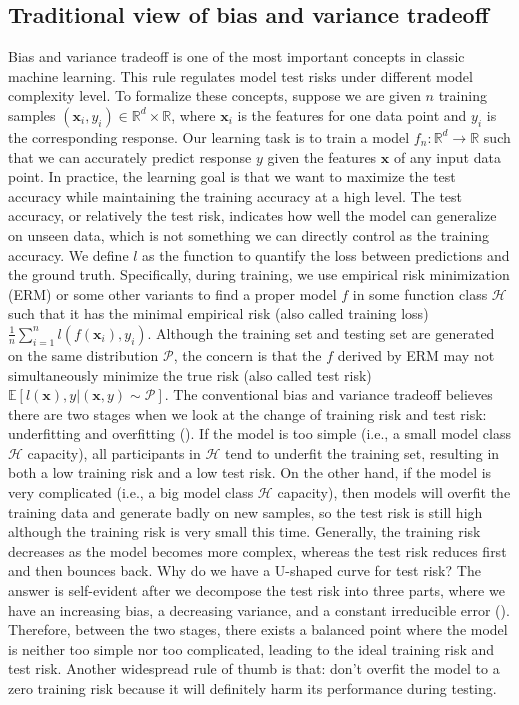 \documentclass{article}
\begin{document}
\subsection{Traditional view of bias and variance tradeoff} \label{traditional}
\vspace{-1mm}
Bias and variance tradeoff is one of the most important concepts in classic machine learning. This rule regulates model test risks under different model complexity level. To formalize these concepts, suppose we are given $n$ training samples $(\mathbf{x}_i, y_i) \in \mathbb{R}^d \times \mathbb{R}$, where $\mathbf{x}_i$ is the features for one data point and $y_i$ is the corresponding response. Our learning task is to train a model $f_n: \mathbb{R}^d \to \mathbb{R}$ such that we can accurately predict response $y$ given the features $\mathbf{x}$ of any input data point. In practice, the learning goal is that we want to maximize the test accuracy while maintaining the training accuracy at a high level. The test accuracy, or relatively the test risk, indicates how well the model can generalize on unseen data, which is not something we can directly control as the training accuracy. We define $l$ as the function to quantify the loss between predictions and the ground truth. Specifically, during training, we use empirical risk minimization (ERM) or some other variants to find a proper model $f$ in some function class $\mathcal{H}$ such that it has the minimal empirical risk (also called training loss) $\frac{1}{n}\sum_{i=1}^nl(f(\mathbf{x}_i), y_i)$. Although the training set and testing set are generated on the same distribution $\mathcal{P}$, the concern is that the $f$ derived by ERM may not simultaneously minimize the true risk (also called test risk) $\mathbb{E}[l(\mathbf{x}), y|(\mathbf{x}, y) \sim \mathcal{P}]$. The conventional bias and variance tradeoff believes there are two stages when we look at the change of training risk and test risk: underfitting and overfitting (\cite{hastie2009elements}). If the model is too simple (i.e., a small model class $\mathcal{H}$ capacity), all participants in $\mathcal{H}$ tend to underfit the training set, resulting in both a low training risk and a low test risk. On the other hand, if the model is very complicated (i.e., a big model class $\mathcal{H}$ capacity), then models will overfit the training data and generate badly on new samples, so the test risk is still high although the training risk is very small this time. Generally, the training risk decreases as the model becomes more complex, whereas the test risk reduces first and then bounces back. Why do we have a U-shaped curve for test risk? The answer is self-evident after we decompose the test risk into three parts, where we have an increasing bias, a decreasing variance, and a constant irreducible error (\cite{neville2008bias}). Therefore, between the two stages, there exists a balanced point where the model is neither too simple nor too complicated, leading to the ideal training risk and test risk. Another widespread rule of thumb is that: don't overfit the model to a zero training risk because it will definitely harm its performance during testing.
\end{document}
